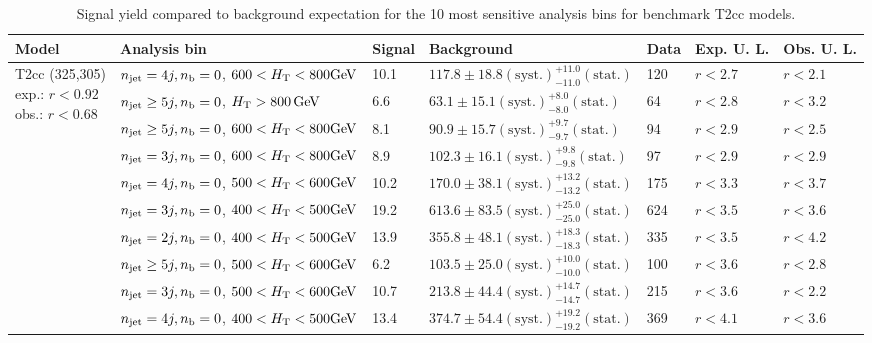 \begin{table}[h!] 
  \scriptsize
  \caption{ 
Signal yield compared to background expectation for the 10 most sensitive analysis bins 
for benchmark T2cc models.
  \label{tab:sigBenchmarksYields_T2cc}}
  \centering 
  \begin{tabular}{ lllllll } 
    \hline 
    \hline 
    Model & Analysis bin & Signal & Background & Data & Exp. U. L. & Obs. U. L. \\ \hline
\multirow{10}{*}{\parbox[t]{2cm}{T2cc (325,305)\\exp.: $r<0.92$\\obs.: $r<0.68$}}
 & $n_{\mathrm{jet}} =4j,n_{\text{b}} =0$, $600 < \mbox{$H_\text{T}$} < 800 \mathrm{GeV}$ & 10.1 & $117.8 \pm 18.8 \mathrm{(syst.)} ^{+11.0}_{-11.0} \mathrm{(stat.)}$ & 120 & $r < 2.7$ & $r < 2.1$\\ 
 & $n_{\mathrm{jet}} \geq5j,n_{\text{b}} =0$, $\mbox{$H_\text{T}$} > 800 \, \mathrm{GeV}$ & 6.6 & $63.1 \pm 15.1 \mathrm{(syst.)} ^{+8.0}_{-8.0} \mathrm{(stat.)}$ & 64 & $r < 2.8$ & $r < 3.2$\\ 
 & $n_{\mathrm{jet}} \geq5j,n_{\text{b}} =0$, $600 < \mbox{$H_\text{T}$} < 800 \mathrm{GeV}$ & 8.1 & $90.9 \pm 15.7 \mathrm{(syst.)} ^{+9.7}_{-9.7} \mathrm{(stat.)}$ & 94 & $r < 2.9$ & $r < 2.5$\\ 
 & $n_{\mathrm{jet}} =3j,n_{\text{b}} =0$, $600 < \mbox{$H_\text{T}$} < 800 \mathrm{GeV}$ & 8.9 & $102.3 \pm 16.1 \mathrm{(syst.)} ^{+9.8}_{-9.8} \mathrm{(stat.)}$ & 97 & $r < 2.9$ & $r < 2.9$\\ 
 & $n_{\mathrm{jet}} =4j,n_{\text{b}} =0$, $500 < \mbox{$H_\text{T}$} < 600 \mathrm{GeV}$ & 10.2 & $170.0 \pm 38.1 \mathrm{(syst.)} ^{+13.2}_{-13.2} \mathrm{(stat.)}$ & 175 & $r < 3.3$ & $r < 3.7$\\ 
 & $n_{\mathrm{jet}} =3j,n_{\text{b}} =0$, $400 < \mbox{$H_\text{T}$} < 500 \mathrm{GeV}$ & 19.2 & $613.6 \pm 83.5 \mathrm{(syst.)} ^{+25.0}_{-25.0} \mathrm{(stat.)}$ & 624 & $r < 3.5$ & $r < 3.6$\\ 
 & $n_{\mathrm{jet}} =2j,n_{\text{b}} =0$, $400 < \mbox{$H_\text{T}$} < 500 \mathrm{GeV}$ & 13.9 & $355.8 \pm 48.1 \mathrm{(syst.)} ^{+18.3}_{-18.3} \mathrm{(stat.)}$ & 335 & $r < 3.5$ & $r < 4.2$\\ 
 & $n_{\mathrm{jet}} \geq5j,n_{\text{b}} =0$, $500 < \mbox{$H_\text{T}$} < 600 \mathrm{GeV}$ & 6.2 & $103.5 \pm 25.0 \mathrm{(syst.)} ^{+10.0}_{-10.0} \mathrm{(stat.)}$ & 100 & $r < 3.6$ & $r < 2.8$\\ 
 & $n_{\mathrm{jet}} =3j,n_{\text{b}} =0$, $500 < \mbox{$H_\text{T}$} < 600 \mathrm{GeV}$ & 10.7 & $213.8 \pm 44.4 \mathrm{(syst.)} ^{+14.7}_{-14.7} \mathrm{(stat.)}$ & 215 & $r < 3.6$ & $r < 2.2$\\ 
 & $n_{\mathrm{jet}} =4j,n_{\text{b}} =0$, $400 < \mbox{$H_\text{T}$} < 500 \mathrm{GeV}$ & 13.4 & $374.7 \pm 54.4 \mathrm{(syst.)} ^{+19.2}_{-19.2} \mathrm{(stat.)}$ & 369 & $r < 4.1$ & $r < 3.6$\\ \hline
    \hline
  \end{tabular}
\end{table}

